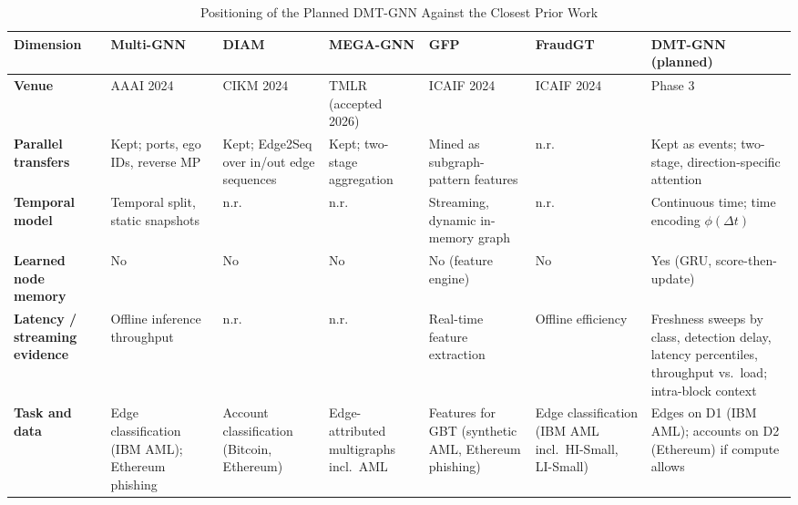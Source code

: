 \documentclass[11pt,a4paper]{article}
\begin{document}
\begin{table}[htbp]
\centering
\scriptsize
\caption{Positioning of the Planned DMT-GNN Against the Closest Prior Work}
\label{tab:prior_work_positioning}
\begin{tabularx}{\textwidth}{L{2.3cm} L{1.85cm} L{1.85cm} L{1.85cm} L{1.85cm} L{1.6cm} X}
\toprule
\textbf{Dimension} & \textbf{Multi-GNN \cite{egressy2024multigraph}} & \textbf{DIAM \cite{ding2024diam}} & \textbf{MEGA-GNN \cite{bilgi2026mega}} & \textbf{GFP \cite{blanusa2024gfp}} & \textbf{FraudGT \cite{lin2024fraudgt}} & \textbf{DMT-GNN (planned)} \\
\midrule
\textbf{Venue} & AAAI 2024 & CIKM 2024 & TMLR (accepted 2026) & ICAIF 2024 & ICAIF 2024 & Phase 3 \\
\midrule
\textbf{Parallel transfers} & Kept; ports, ego IDs, reverse MP & Kept; Edge2Seq over in/out edge sequences & Kept; two-stage aggregation & Mined as subgraph-pattern features & n.r. & Kept as events; two-stage, direction-specific attention \\
\midrule
\textbf{Temporal model} & Temporal split, static snapshots & n.r. & n.r. & Streaming, dynamic in-memory graph & n.r. & Continuous time; time encoding $\phi(\Delta t)$ \\
\midrule
\textbf{Learned node memory} & No & No & No & No (feature engine) & No & Yes (GRU, score-then-update) \\
\midrule
\textbf{Latency / streaming evidence} & Offline inference throughput & n.r. & n.r. & Real-time feature extraction & Offline efficiency & Freshness sweeps by class, detection delay, latency percentiles, throughput vs.\ load; intra-block context \\
\midrule
\textbf{Task and data} & Edge classification (IBM AML); Ethereum phishing & Account classification (Bitcoin, Ethereum) & Edge-attributed multigraphs incl.\ AML & Features for GBT (synthetic AML, Ethereum phishing) & Edge classification (IBM AML incl.\ HI-Small, LI-Small) & Edges on D1 (IBM AML); accounts on D2 (Ethereum) if compute allows \\
\bottomrule
\end{tabularx}
\end{table}
\end{document}
